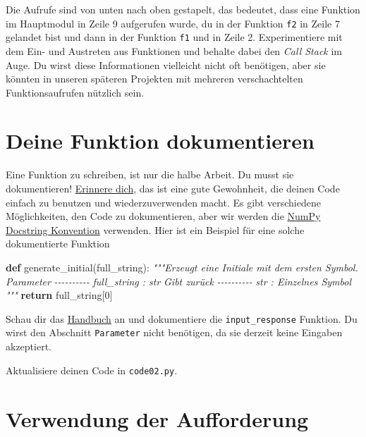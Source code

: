 \documentclass[
]{book}
\newenvironment{Shaded}{\begin{snugshade}}{\end{snugshade}}
\newcommand{\CommentTok}[1]{\textcolor[rgb]{0.56,0.35,0.01}{\textit{#1}}}
\newcommand{\ControlFlowTok}[1]{\textcolor[rgb]{0.13,0.29,0.53}{\textbf{#1}}}
\newcommand{\DecValTok}[1]{\textcolor[rgb]{0.00,0.00,0.81}{#1}}
\newcommand{\KeywordTok}[1]{\textcolor[rgb]{0.13,0.29,0.53}{\textbf{#1}}}
\newcommand{\NormalTok}[1]{#1}
\begin{document}
Die Aufrufe sind von unten nach oben gestapelt, das bedeutet, dass eine Funktion im Hauptmodul in Zeile 9 aufgerufen wurde, du in der Funktion \texttt{f2} in Zeile 7 gelandet bist und dann in der Funktion \texttt{f1} und in Zeile 2. Experimentiere mit dem Ein- und Austreten aus Funktionen und behalte dabei den \emph{Call Stack} im Auge. Du wirst diese Informationen vielleicht nicht oft benötigen, aber sie könnten in unseren späteren Projekten mit mehreren verschachtelten Funktionsaufrufen nützlich sein.

\hypertarget{numpy-docstring}{%
\section{Deine Funktion dokumentieren}\label{numpy-docstring}}

Eine Funktion zu schreiben, ist nur die halbe Arbeit. Du musst sie dokumentieren! \protect\hyperlink{programming-tips}{Erinnere dich}, das ist eine gute Gewohnheit, die deinen Code einfach zu benutzen und wiederzuverwenden macht. Es gibt verschiedene Möglichkeiten, den Code zu dokumentieren, aber wir werden die \href{https://numpydoc.readthedocs.io/en/latest/format.html\#docstring-standard}{NumPy Docstring Konvention} verwenden. Hier ist ein Beispiel für eine solche dokumentierte Funktion

\begin{Shaded}
\begin{Highlighting}[]
\KeywordTok{def}\NormalTok{ generate\_initial(full\_string):}
    \CommentTok{"""Erzeugt eine Initiale mit dem ersten Symbol.}
\CommentTok{    }
\CommentTok{    Parameter}
\CommentTok{    {-}{-}{-}{-}{-}{-}{-}{-}{-}{-}}
\CommentTok{    full\_string : str}
\CommentTok{    }
\CommentTok{    Gibt zurück}
\CommentTok{    {-}{-}{-}{-}{-}{-}{-}{-}{-}{-}}
\CommentTok{    str : Einzelnes Symbol}
\CommentTok{    """}
    \ControlFlowTok{return}\NormalTok{ full\_string[}\DecValTok{0}\NormalTok{]}
\end{Highlighting}
\end{Shaded}

Schau dir das \href{https://numpydoc.readthedocs.io/en/latest/format.html\#docstring-standard}{Handbuch} an und dokumentiere die \texttt{input\_response} Funktion. Du wirst den Abschnitt \texttt{Parameter} nicht benötigen, da sie derzeit keine Eingaben akzeptiert.

Aktualisiere deinen Code in \texttt{code02.py}.

\hypertarget{verwendung-der-aufforderung}{%
\section{Verwendung der Aufforderung}\label{verwendung-der-aufforderung}}
\end{document}

